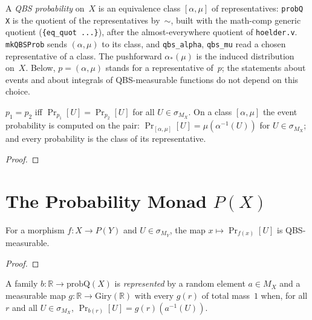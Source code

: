 \begin{definition}\label{def:probQ}
  \rocqok
  A \emph{QBS probability} on~$X$ is an equivalence class $[\alpha, \mu]$ of
  representatives: \texttt{probQ X} is the quotient of the representatives
  by~$\sim$, built with the math-comp generic quotient
  (\texttt{\{eq\_quot\ ...\}}), after the almost-everywhere quotient of
  \texttt{hoelder.v}. \texttt{mkQBSProb} sends $(\alpha, \mu)$ to its class,
  and \texttt{qbs\_alpha}, \texttt{qbs\_mu} read a chosen
  representative of a class. The pushforward $\alpha_*(\mu)$ is the induced
  distribution on~$X$. Below, $p = (\alpha, \mu)$ stands for a
  representative of~$p$; the statements about events and about integrals of
  QBS-measurable functions do not depend on this choice.
\end{definition}

\begin{lemma}\label{lem:qbs_eqP}
  \rocqok
  $p_1 = p_2$ iff $\Pr_{p_1}[U] = \Pr_{p_2}[U]$ for all
  $U \in \sigma_{M_X}$. On a class $[\alpha, \mu]$ the event probability is
  computed on the pair: $\Pr_{[\alpha, \mu]}[U] = \mu(\alpha^{-1}(U))$ for
  $U \in \sigma_{M_X}$; and every probability is the class of its
  representative.
\end{lemma}
\begin{proof}\rocqok\end{proof}


\section{The Probability Monad $P(X)$}\label{sec:monadP}

\begin{lemma}\label{lem:qbs_measurable_event}
  \rocqok
  For a morphism $f : X \to P(Y)$ and $U \in \sigma_{M_Y}$, the map
  $x \mapsto \Pr_{f(x)}[U]$ is QBS-measurable.
\end{lemma}
\begin{proof}\rocqok\end{proof}

\begin{definition}\label{def:qbs_rep}
  \rocqok
  A family $b : \mathbb{R} \to \mathrm{probQ}(X)$ is \emph{represented}
  by a random element $a \in M_X$ and a measurable map
  $g : \mathbb{R} \to \mathrm{Giry}(\mathbb{R})$ with every $g(r)$ of
  total mass~$1$ when, for all $r$ and all $U \in \sigma_{M_X}$,
  $\Pr_{b(r)}[U] = g(r)(a^{-1}(U))$.
\end{definition}

